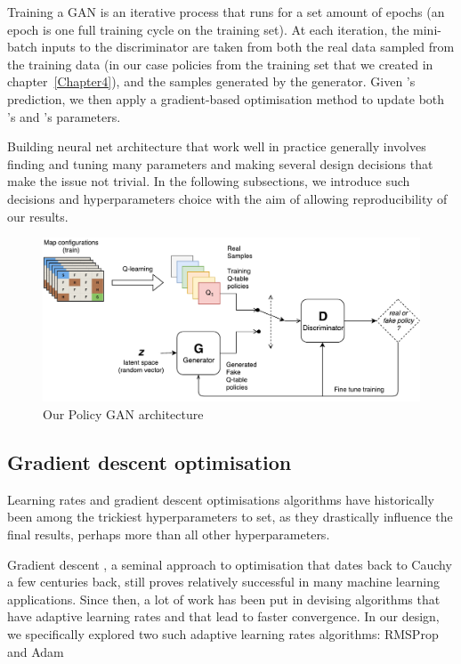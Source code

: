 Training a GAN is an iterative process that runs for a set amount of epochs (an epoch is one full training cycle on the training set).
At each iteration, the mini-batch inputs to the discriminator  are taken from both the real data sampled from the training data (in our case policies from the training set that we created in chapter~\ref{Chapter4}), and the samples generated by the generator.
Given 's prediction, we then apply a gradient-based optimisation method to update both 's and 's parameters.

Building neural net architecture that work well in practice generally involves finding and tuning many parameters and making several design decisions that make the issue not trivial. In the following subsections, we introduce such decisions and hyperparameters choice with the aim of allowing reproducibility of our results.


\begin{figure}
\centering
\includegraphics[width=15cm]{Figures/PolicyGAN}
\caption{Our Policy GAN architecture}
\label{fig:PolicyGAN}
\end{figure}

\subsection{Gradient descent optimisation}
Learning rates and gradient descent optimisations algorithms have historically been among the trickiest hyperparameters to set, as they drastically influence the final results, perhaps more than all other hyperparameters.

Gradient descent \citep{lemarechal2012cauchy}, a seminal approach to optimisation that dates back to Cauchy a few centuries back, still proves relatively successful in many machine learning applications.
Since then, a lot of work has been put in devising algorithms that have adaptive learning rates and that lead to faster convergence. In our design, we specifically explored two such adaptive learning rates algorithms: RMSProp \citep{hinton2012neural} and Adam \citep{DBLP:journals/corr/KingmaB14}

